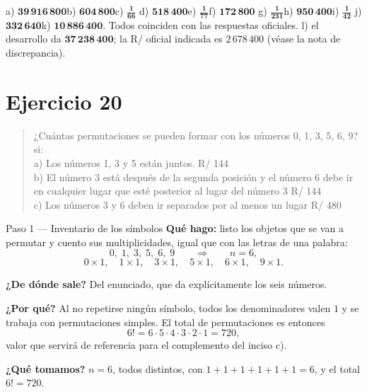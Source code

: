 \documentclass[11pt]{article}
\begin{document}
\begin{resp}
a) $\mathbf{39\,916\,800}$\quad b) $\mathbf{604\,800}$\quad c) $\mathbf{\frac{1}{66}}$\quad
d) $\mathbf{518\,400}$\quad e) $\mathbf{\frac{1}{77}}$\quad f) $\mathbf{172\,800}$\quad
g) $\mathbf{\frac{1}{231}}$\quad h) $\mathbf{950\,400}$\quad i) $\mathbf{\frac{1}{42}}$\quad
j) $\mathbf{332\,640}$\quad k) $\mathbf{10\,886\,400}$.
Todos coinciden con las respuestas oficiales. \quad
l) el desarrollo da $\mathbf{37\,238\,400}$; la R/ oficial indicada es $2\,678\,400$ (véase la nota de
discrepancia).
\end{resp}

\section*{Ejercicio 20}

\begin{quote}
¿Cuántas permutaciones se pueden formar con los números 0, 1, 3, 5, 6, 9? si:\\
a) Los números 1, 3 y 5 están juntos. \hfill R/ 144\\
b) El número 3 está después de la segunda posición y el número 6 debe ir en cualquier lugar que esté
posterior al lugar del número 3 \hfill R/ 144\\
c) Los números 3 y 6 deben ir separados por al menos un lugar \hfill R/ 480
\end{quote}

\begin{paso}{Paso 1 --- Inventario de los símbolos}
\textbf{Qué hago:} listo los objetos que se van a permutar y cuento sus multiplicidades, igual que con las
letras de una palabra:
\[
0,\;1,\;3,\;5,\;6,\;9\qquad\Longrightarrow\qquad n=6,
\]
\[
0\times1,\quad 1\times1,\quad 3\times1,\quad 5\times1,\quad 6\times1,\quad 9\times1 .
\]

\textbf{¿De dónde sale?} Del enunciado, que da explícitamente los seis números.

\textbf{¿Por qué?} Al no repetirse ningún símbolo, todos los denominadores valen $1$ y se trabaja con
permutaciones simples. El total de permutaciones es entonces
\[
6!=6\cdot5\cdot4\cdot3\cdot2\cdot1=720 ,
\]
valor que servirá de referencia para el complemento del inciso c).

\textbf{¿Qué tomamos?} $n=6$, todos distintos, con $1+1+1+1+1+1=6$, y el total $6!=720$.
\end{paso}
\end{document}
